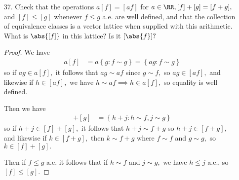 \documentclass{article}
\begin{document}
\begin{itemize}
	\item[37.] Check that the operations $a[f]=[af]$ for $a\in\RR, [f]+[g]=[f+g],$ and $[f]\le [g]$ whenever $f\le g$ a.e. are well defined, and that the collection of equivalence classes is a vector lattice when supplied with this arithmetic. What is $\abs{[f]}$ in this lattice? Is it $[\abs{f}]?$
		\begin{proof}
			We have
			\begin{align*}
				a[f] &= a\left\{ g:f\sim g \right\}  = \left\{ ag:f\sim g \right\}
			\end{align*}
			so if $ag\in a[f],$ it follows that $ag\sim af$ since $g\sim f,$ so $ag\in [af],$ and likewise if $h\in [af],$ we have $h\sim af\implies h\in a[f],$ so equality is well defined.

			Then we have
			\begin{align*}
				[f] + [g] &= \left\{ h + j:h\sim f, j\sim g \right\}
			\end{align*}
			so if $h+j\in [f] + [g],$ it follows that $h+j\sim f+g$ so $h+j\in[f+g],$ and likewise if $k\in [f+g],$ then $k\sim f+g$ where $f\sim f$ and $g\sim g,$ so $k\in [f]+[g].$

			Then if $f\le g$ a.e. it follows that if $h\sim f$ and $j\sim g,$ we have $h\le j$ a.e., so $[f]\le [g].$
		\end{proof}
		
\end{itemize}
\end{document}
